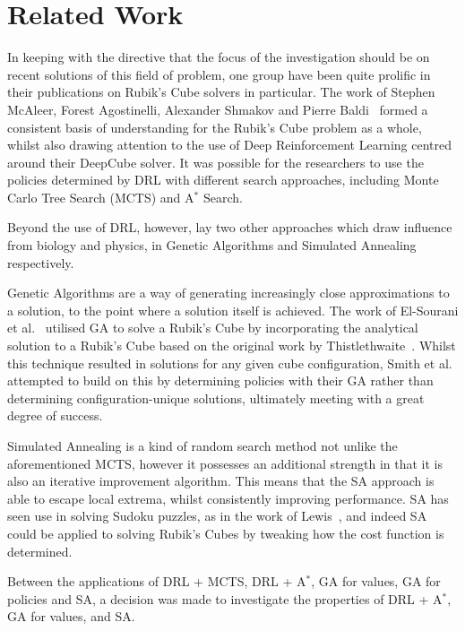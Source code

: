 \documentclass[UKenglish]{svproc}
\begin{document}
\section{Related Work}
In keeping with the directive that the focus of the investigation should be on recent solutions of this field of problem, one group have been quite prolific in their publications on Rubik's Cube solvers in particular. The work of Stephen McAleer, Forest Agostinelli, Alexander Shmakov and Pierre Baldi~\cite{mcaleer2018solving, mcaleer2019solving, agostinelli2019solving} formed a consistent basis of understanding for the Rubik's Cube problem as a whole, whilst also drawing attention to the use of Deep Reinforcement Learning centred around their DeepCube solver. It was possible for the researchers to use the policies determined by DRL with different search approaches, including Monte Carlo Tree Search (MCTS) and A$^{\ast}$ Search.

Beyond the use of DRL, however, lay two other approaches which draw influence from biology and physics, in Genetic Algorithms and Simulated Annealing respectively.

Genetic Algorithms are a way of generating increasingly close approximations to a solution, to the point where a solution itself is achieved. The work of El-Sourani et al.~\cite{10.1007/978-3-642-12239-2_9} utilised GA to solve a Rubik's Cube by incorporating the analytical solution to a Rubik's Cube based on the original work by Thistlethwaite~\cite{Thistlethwaite}. Whilst this technique resulted in solutions for any given cube configuration, Smith et al.~\cite{10.1145/2908812.2908887} attempted to build on this by determining policies with their GA rather than determining configuration-unique solutions, ultimately meeting with a great degree of success.

Simulated Annealing is a kind of random search method not unlike the aforementioned MCTS, however it possesses an additional strength in that it is also an iterative improvement algorithm. This means that the SA approach is able to escape local extrema, whilst consistently improving performance. SA has seen use in solving Sudoku puzzles, as in the work of Lewis~\cite{SAarticle}, and indeed SA could be applied to solving Rubik's Cubes by tweaking how the cost function is determined.

Between the applications of DRL + MCTS, DRL + A$^{\ast}$, GA for values, GA for policies and SA, a decision was made to investigate the properties of DRL + A$^{\ast}$, GA for values, and SA.
\end{document}
